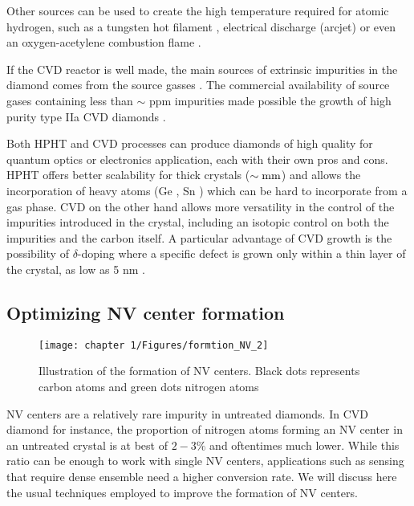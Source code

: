 \documentclass[a4paper,11pt]{report}
\begin{document}
\begin{refsection}
Other sources can be used to create the high temperature required for atomic hydrogen, such as a tungsten hot filament \citep{haubner1993diamond}, electrical discharge (arcjet) \citep{luque1998excited} or even an oxygen-acetylene combustion flame \citep{bachmann1991towards}.

If the CVD reactor is well made, the main sources of extrinsic impurities in the diamond comes from the source gasses \citep{balmer2009chemical}. The commercial availability of source gases containing less than $\sim$ ppm impurities made possible the growth of  high purity type IIa CVD diamonds \citep{kasu2003high, twitchen2004high, tallaire2006characterisation}.

\medskip
Both HPHT and CVD processes can produce diamonds of high quality for quantum optics or electronics application, each with their own pros and cons. HPHT offers better scalability for thick crystals ($\sim \rm mm$) and allows the incorporation of heavy atoms (Ge \citep{palyanov2015germanium} , Sn \citep{ekimov2019effect}) which can be hard to incorporate from a gas phase. CVD on the other hand allows more versatility in the control of the impurities introduced in the crystal, including an isotopic control on both the impurities and the carbon itself. A particular advantage of CVD growth is the possibility of $\delta$-doping where a specific defect is grown only within a thin layer of the crystal, as low as 5 nm \citep{ohno2012engineering, ishikawa2012optical, ohashi2013negatively}.

\subsection{Optimizing NV center formation}
\begin{figure}[h!]
\centering
\texttt{[image: chapter 1/Figures/formtion\_NV\_2]}
\caption{Illustration of the formation of NV centers. Black dots represents carbon atoms and green dots nitrogen atoms}
\label{formation NV}
\end{figure}

NV centers are a relatively rare impurity in untreated diamonds. In CVD diamond for instance, the proportion of nitrogen atoms forming an NV center in an untreated crystal is at best of $2-3 \%$ \citep{hartland2014study} and oftentimes much lower. While this ratio can be enough  to work with single NV centers, applications such as sensing that require dense ensemble need a higher conversion rate. We will discuss here the usual techniques employed to improve the formation of NV centers.


\end{refsection}
\end{document}
